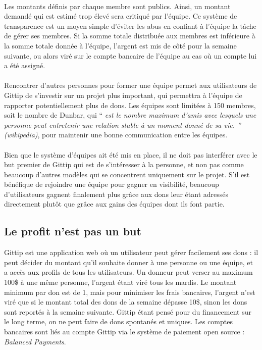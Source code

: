 \paragraph{}
Les montants définis par chaque membre sont publics. Ainsi, un montant demandé
qui est estimé trop élevé sera critiqué par l'équipe. Ce système de
transparence est un moyen simple d'éviter les abus en confiant à l'équipe la
tâche de gérer ses membres. Si la somme totale distribuée aux membres est
inférieure à la somme totale donnée à l'équipe, l'argent est mis de côté pour
la semaine suivante, ou alors viré sur le compte bancaire de l'équipe au cas où
un compte lui a été assigné.

\paragraph{}
Rencontrer d'autres personnes pour former une équipe permet aux utilisateurs de
Gittip de s'investir sur un projet plus important, qui permettra à l'équipe de
rapporter potentiellement plus de dons. Les équipes sont limitées à 150
membres, soit le nombre de Dunbar, qui `` \emph{est le nombre maximum
d'amis avec lesquels une personne peut entretenir une relation stable à un
moment donné de sa vie. '' (wikipedia)}, pour maintenir une bonne communication
entre les équipes.

\paragraph{}
Bien que le système d'équipes ait été mis en place, il ne doit pas interférer
avec le but premier de Gittip qui est de s'intéresser à la personne, et non pas
comme beaucoup d'autres modèles qui se concentrent uniquement sur le projet.
S'il est bénéfique de rejoindre une équipe pour gagner en visibilité, beaucoup
d'utilisateurs gagnent finalement plus grâce aux dons leur étant adressés
directement plutôt que grâce aux gains des équipes dont ils font partie.

    \subsection{Le profit n'est pas un but}

Gittip est une application web où un utilisateur peut gérer facilement ses dons
: il peut décider du montant qu'il souhaite donner à une personne ou une
équipe, et a accès aux profils de tous les utilisateurs. Un donneur peut verser
au maximum 100\${} à une même personne, l'argent étant viré tous les mardis. Le
montant minimum par don est de 1\textcent, mais pour minimiser les frais
bancaires, l'argent n'est viré que si le montant total des dons de la semaine
dépasse 10\${}, sinon les dons sont reportés à la semaine suivante.  Gittip
étant pensé pour du financement sur le long terme, on ne peut faire de dons
spontanés et uniques. Les comptes bancaires sont liés au compte Gittip via le
système de paiement open source : \emph{Balanced Payments}.

